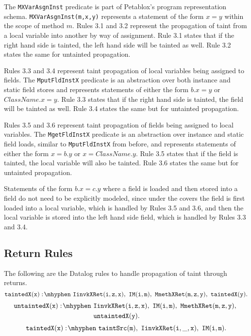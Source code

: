 The \texttt{MXVarAsgnInst} predicate is part of Petablox's program
representation schema. \texttt{MXVarAsgnInst(m,x,y)} represents a
statement of the form $x = y$ within the scope of method $m$. Rules
3.1 and 3.2 represent the propagation of taint from a local variable
into another by way of assignment. Rule 3.1 states that if the right
hand side is tainted, the left hand side will be tainted as well. Rule
3.2 states the same for untainted propagation.

Rules 3.3 and 3.4 represent taint propagation of local variables being
assigned to fields. The \texttt{MputFldInstX} predicate is an
abstraction over both instance and static field stores and represents
statements of either the form $b.x = y$ or $ClassName.x = y$. Rule 3.3
states that if the right hand side is tainted, the field will be
tainted as well. Rule 3.4 states the same but for untainted
propagation.

Rules 3.5 and 3.6 represent taint propagation of fields being assigned
to local variables. The \texttt{MgetFldInstX} predicate is an
abstraction over instance and static field loads, similar to
\texttt{MputFldInstX} from before, and represents statements of either
the form $x = b.y$ or $x = ClassName.y$. Rule 3.5 states that if the
field is tainted, the local variable will also be tainted. Rule 3.6
states the same but for untainted propagation.

Statements of the form $b.x = c.y$ where a field is loaded and then
stored into a field do not need to be explicitly modeled, since under
the covers the field is first loaded into a local variable, which is
handled by Rules 3.5 and 3.6, and then the local variable is stored
into the left hand side field, which is handled by Rules 3.3 and 3.4.
\subsection{Return Rules}
The following are the Datalog rules to handle propagation of taint
through returns.
\begin{equation}
  \mathtt{taintedX(x) \is IinvkXRet(i,z,x) \also IM(i,m) \also
    MmethXRet(m,z,y) \also taintedX(y).}
\end{equation}
\begin{equation}
  \begin{split}
    \mathtt{untaintedX(x) \is} & \mathtt{IinvkXRet(i,z,x) \also
      IM(i,m) \also MmethXRet(m,z,y) \also} \\ & \mathtt{
      untaintedX(y).} \\
  \end{split}
\end{equation}
\begin{equation}
  \mathtt{taintedX(x) \is taintSrc(m) \also IinvkXRet(i,\_,x) \also
    IM(i,m).}
\end{equation}

